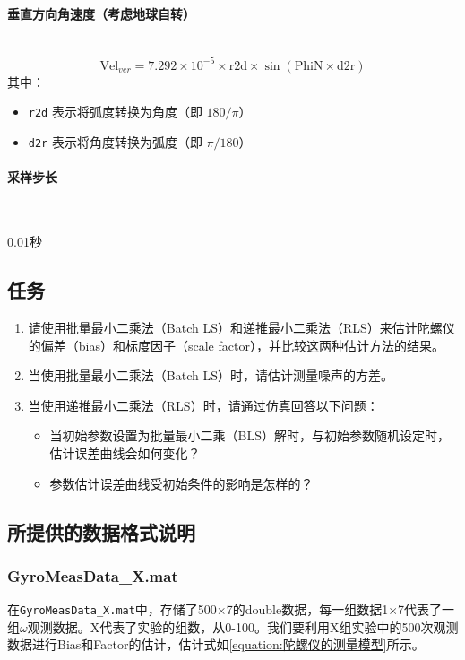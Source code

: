 \documentclass[openany,12pt,UTF8]{ctexart}
\begin{document}
\paragraph{垂直方向角速度（考虑地球自转）}\
\begin{equation}
    \text{Vel}_{ver} = 7.292 \times 10^{-5} \times \text{r2d} \times \sin(\text{PhiN} \times \text{d2r})
\end{equation}
其中：
\begin{itemize}
    \item \texttt{r2d} 表示将弧度转换为角度（即 $180/\pi$）
    \item \texttt{d2r} 表示将角度转换为弧度（即 $\pi/180$）
\end{itemize}

\paragraph{采样步长}\

0.01秒

\subsection{任务}
\begin{enumerate}
    \item 请使用批量最小二乘法（Batch LS）和递推最小二乘法（RLS）来估计陀螺仪的偏差（bias）和标度因子（scale factor），并比较这两种估计方法的结果。
    \item 当使用批量最小二乘法（Batch LS）时，请估计测量噪声的方差。
    \item 当使用递推最小二乘法（RLS）时，请通过仿真回答以下问题：
          \begin{itemize}
              \item 当初始参数设置为批量最小二乘（BLS）解时，与初始参数随机设定时，估计误差曲线会如何变化？
              \item 参数估计误差曲线受初始条件的影响是怎样的？
          \end{itemize}
\end{enumerate}

\subsection{所提供的数据格式说明}
\subsubsection{GyroMeasData\_X.mat}
在\texttt{GyroMeasData\_X.mat}中，存储了500×7的double数据，每一组数据1×7代表了一组\(\omega\)观测数据。X代表了实验的组数，从0-100。我们要利用X组实验中的500次观测数据进行Bias和Factor的估计，估计式如\autoref{equation:陀螺仪的测量模型}所示。
\end{document}
